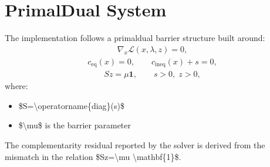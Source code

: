 \documentclass[letterpaper,10pt,english]{sphinxmanual}
\begin{document}
\section{Primal\sphinxhyphen{}Dual System}
\label{\detokenize{optima_internal_protocol:primal-dual-system}}
\sphinxAtStartPar
The implementation follows a primal\sphinxhyphen{}dual barrier structure built around:
\begin{equation*}
\begin{split}\nabla_x \mathcal{L}(x,\lambda,z) = 0,\end{split}
\end{equation*}\begin{equation*}
\begin{split}c_{\mathrm{eq}}(x)=0,
\qquad
c_{\mathrm{ineq}}(x)+s=0,\end{split}
\end{equation*}\begin{equation*}
\begin{split}S z = \mu \mathbf{1},
\qquad
s>0,\; z>0,\end{split}
\end{equation*}
\sphinxAtStartPar
where:
\begin{itemize}
\item {} 
\sphinxAtStartPar
\$S=\textbackslash{}operatorname\{diag\}(s)\$

\item {} 
\sphinxAtStartPar
\$\textbackslash{}mu\$ is the barrier parameter

\end{itemize}

\sphinxAtStartPar
The complementarity residual reported by the solver is derived from the mismatch in the relation \$Sz=\textbackslash{}mu \textbackslash{}mathbf\{1\}\$.
\end{document}
